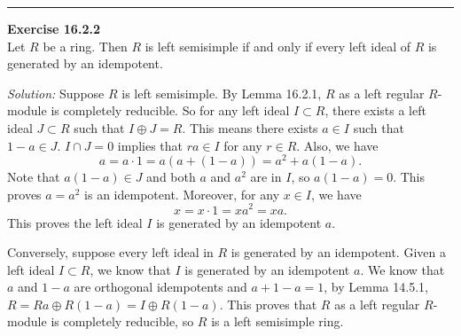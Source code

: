 \documentclass[a4paper, 12pt]{article}
\newenvironment{problem}[2][Exercise]
    { \begin{mdframed}[backgroundcolor=gray!20] \textbf{#1 #2} \\}
    {  \end{mdframed}}
\newenvironment{solution}
    {\textit{Solution:}}
    {}
\begin{document}
\noindent\rule{7in}{2.8pt}
\newpage
\begin{problem}{16.2.2}
Let \(R\) be a ring. Then \(R\) is left semisimple if and only if every left ideal of \(R\) is generated by an idempotent.
\end{problem}
\begin{solution}
Suppose \(R\) is left semisimple. By Lemma 16.2.1, \(R\) as a left regular \(R\)-module is completely reducible. So for any left ideal \(I\subset R\), there exists a left ideal \(J\subset R\) such that 
\(I\oplus J=R\). This means there exists \(a\in I\) such that \(1-a\in J\). \(I\cap J=0\) implies that \(ra\in I\) for any \(r\in R\). Also, we have 
\[a=a\cdot 1=a(a+(1-a))=a^2+a(1-a).\]
Note that \(a(1-a)\in J\) and both \(a\) and \(a^2\) are in \(I\), so \(a(1-a)=0\). This proves \(a=a^2\) is an idempotent. Moreover, for any \(x\in I\), we have 
\[x=x\cdot 1=xa^2=xa.\]
This proves the left ideal \(I\) is generated by an idempotent \(a\). 

Conversely, suppose every left ideal in \(R\) is generated by an idempotent. Given a left ideal \(I\subset R\), we know that \(I\) is generated by an idempotent \(a\). We know that 
\(a\) and \(1-a\) are orthogonal idempotents and \(a+1-a=1\), by Lemma 14.5.1, \(R=Ra\oplus R(1-a)=I\oplus R(1-a)\). This proves that \(R\) as a left regular \(R\)-module is completely reducible, so \(R\) is a left semisimple ring.  
\end{solution}
\end{document}
